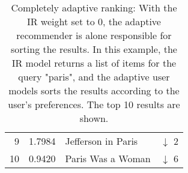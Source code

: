 \begin{table}[t]
\begin{minipage}{0.49\textwidth}
\begin{tabular*}{\textwidth}{ r l l l }
    9 & 1.7984 &  Jefferson in Paris          & \color{red} $\downarrow$ 2 \\
    10& 0.9420 &  Paris Was a Woman           & \color{red} $\downarrow$ 6 \\
    \bottomrule
  \end{tabular*}
  \end{minipage} 
  \vspace{1em}
  \caption[Completely Adaptive Ranking]{
    Completely adaptive ranking: With the IR weight set to $0$,
    the adaptive recommender is alone responsible for sorting the results.
    In this example, the IR model returns a list of items for the query "paris",
    and the adaptive user models sorts the results according to the user's preferences.
    The top 10 results are shown.
  }
  \label{table:rank:paris}
\end{table}

